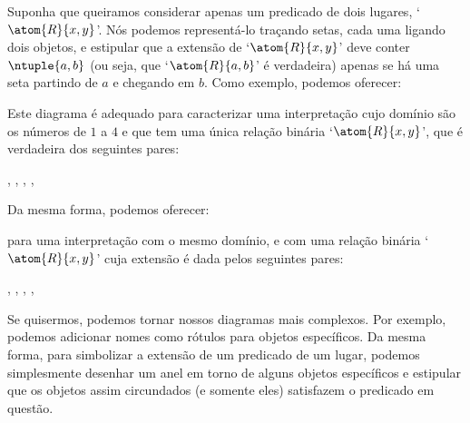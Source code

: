 Suponha que queiramos considerar apenas um predicado de dois lugares, `$\atom{R}{x,y}$'.
Nós podemos representá-lo traçando setas, cada uma ligando dois objetos, e estipular que a extensão de `$\atom{R}{x,y}$' deve conter $\ntuple{a,b}$ (ou seja, que `$\atom{R}{a,b}$' é verdadeira) apenas se há uma seta partindo de $a$ e chegando em $b$.
Como exemplo, podemos oferecer:
\begin{center}
\end{center}
Este diagrama é adequado para caracterizar uma interpretação cujo domínio são os números de $1$ a $4$ e que tem uma única relação binária `$\atom{R}{x,y}$', que é verdadeira dos seguintes pares:
	\begin{center}
		, 
		, 
		, 
		, 
	\end{center}
Da mesma forma, podemos oferecer:

\begin{center}
\end{center}
para uma interpretação com o mesmo domínio, e com uma relação binária `$\atom{R}{x,y}$' cuja extensão é dada pelos seguintes pares:
	\begin{center}
		, 
		, 
		, 
		,
	\end{center}
Se quisermos, podemos tornar nossos diagramas mais complexos. Por exemplo, podemos adicionar nomes como rótulos para objetos específicos.
Da mesma forma, para simbolizar a extensão de um predicado de um lugar, podemos simplesmente desenhar um anel em torno de alguns objetos específicos e estipular que os objetos assim circundados (e somente eles) satisfazem o predicado em questão. 


